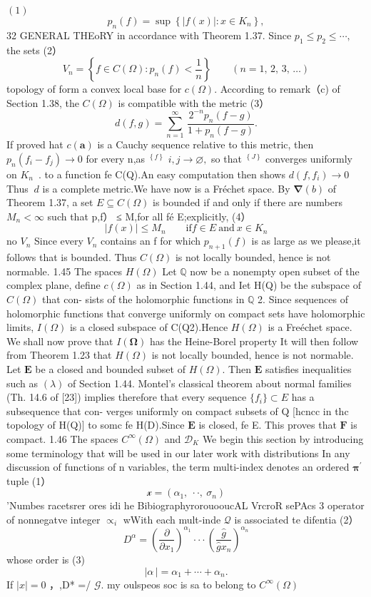 $\operatorname{\mathcal{(1)}}$ $$ p_{n}(f)=\operatorname*{sup}\left\{|f(x)|:x\in K_{n}\right\}, $$32 GENERAL THEoRY in accordance with Theorem 1.37. Since $p_{1}\leq p_{2}\leq\cdots,$ the sets (2） $$ V_{n}=\left\{f\in C(\Omega)\colon p_{n}(f)<\frac{1}{n}\right\}\qquad(n=1,\,2,\,3,\,\ldots) $$ topology of form a convex local base for $c(\Omega).$ According to remark（c) of Section 1.38, the $C(\Omega)$ is compatible with the metric (3） $$ d(f,g)=\sum_{n=1}^{\infty}\,\frac{2^{-n}p_{n}(f-g)}{1+p_{n}(f-g)}. $$ If proved hat $c(\mathbf{a})$ is a Cauchy sequence relative to this metric, then $p_{n}(f_{i}-f_{j})\to0$ for every n,as $^{\left\{f\right\}}$ $i,j\to\varnothing,$ so that $^{\left\{J\right\}}$ converges uniformly on $K_{n}\,$ . to a function fe C(Q).An easy computation then shows $d(f,f_{i})\to0$ Thus $\ d$ is a complete metric.We have now is a Fréchet space. By $\mathbf{\nabla}(b)$ of Theorem 1.37, a set $E\subseteq C(\Omega)$ is bounded if and only if there are numbers $M_{n}<\infty$ such that p,f） ≤ M,for all fé E;explicitly, (4） $$ |f(x)|\leq M_{n}\qquad\mathrm{if}f\in E{\mathrm{~and~}}x\in K_{n} $$ no $V_{n}$ Since every $V_{n}$ contains an f for which $p_{n+1}(f)$ is as large as we please,it follows that is bounded. Thus $C(\Omega)$ is not locally bounded, hence is not normable. 1.45 The spaces $H(\Omega)$ Let $\mathbb{Q}$ now be a nonempty open subset of the complex plane, define $c(\Omega)$ as in Section 1.44, and Iet H(Q) be the subspace of $C(\Omega)$ that con- sists of the holomorphic functions in $\mathbb{Q}$ 2. Since sequences of holomorphic functions that converge uniformly on compact sets have holomorphic limits, $\scriptstyle I(\Omega)$ is a closed subspace of C(Q2).Hence $H(\Omega)$ is a Freéchet space. We shall now prove that $I({\boldsymbol{\Omega}})$ has the Heine-Borel property It will then follow from Theorem 1.23 that $H(\Omega)$ is not locally bounded, hence is not normable. Let $\boldsymbol{E}$ be a closed and bounded subset of $H(\Omega).$ Then $\boldsymbol{E}$ satisfies inequalities such as $(\lambda)$ of Section 1.44. Montel's classical theorem about normal families (Th. 14.6 of [23]) implies therefore that every sequence $\{f_{i}\}\subset E$ has a subsequence that con- verges uniformly on compact subsets of Q [hcncc in thc topology of H(Q)] to somc fe H(D).Since ${\boldsymbol{E}}$ is closed, fe E. This proves that ${\boldsymbol{F}}$ is compact. 1.46 The spaces $C^{\infty}(\Omega)$ and ${\mathcal{D}}_{K}$ We begin this section by introducing some terminology that will be used in our later work with distributions In any discussion of functions of n variables, the term multi-index denotes an ordered ${\boldsymbol{\pi}}^{\prime}$ tuple (1） $$ {\mathcal{x}}=(\alpha_{1},\ \cdot\cdot,\ \sigma_{n}) $$ 'Numbes racetsrer ores idi he BibiographyrorouooucAL VrcroR sePAcs 3 operator of nonnegatve integer $\propto_{i}$ wWith each mult-inde $\textstyle{\mathcal{Q}}$ is associated te difentia (2） $$ D^{\alpha}=\left(\frac{\partial}{\partial x_{1}}\right)^{\alpha_{1}}\cdot\cdot\cdot\left(\frac{\hat{g}}{\hat{g}x_{n}}\right)^{\alpha_{n}} $$ whose order is (3) $$ |\alpha\,|=\alpha_{1}+\cdots+\alpha_{n}. $$ If $|x|=0$ ，,D* =/ ${\mathcal{G}}.$ my oulspeos soc is sa to belong to $C^{\infty}(\Omega)$ 